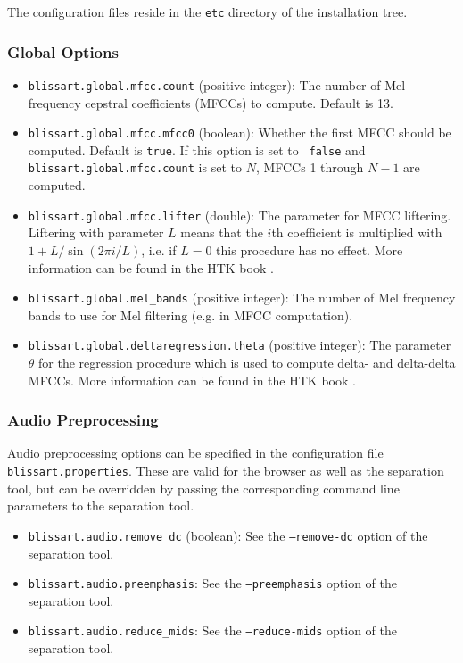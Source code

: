The configuration files reside in the {\tt etc} directory of the installation
tree.


\subsubsection{Global Options}
\label{section:ConfigFileGlobal}

\begin{itemize}
  \item   {\tt blissart.global.mfcc.count} (positive integer): The number of
    Mel frequency cepstral coefficients (MFCCs) to compute. Default is 13.
  \item   {\tt blissart.global.mfcc.mfcc0} (boolean): Whether the first MFCC
    should be computed. Default is {\tt true}. If this option is set to {\tt
    false} and {\tt blissart.global.mfcc.count} is set to $N$, MFCCs 1 through 
    $N-1$ are computed.
  \item   {\tt blissart.global.mfcc.lifter} (double): The parameter for MFCC
    liftering. Liftering with parameter $L$ means that the $i$th
    coefficient is multiplied with $1 + L / \sin(2\pi i / L)$, i.e. if
    $L=0$ this procedure has no effect. More information can be found in
    the HTK book \cite{HTKBook}.
  \item   {\tt blissart.global.mel\_bands} (positive integer): The number of
    Mel frequency bands to use for Mel filtering (e.g. in MFCC computation).
  \item   {\tt blissart.global.deltaregression.theta} (positive integer): The
    parameter $\theta$ for the regression procedure which is used to
    compute delta- and delta-delta MFCCs. More information can be found in
    the HTK book \cite{HTKBook}.
\end{itemize}


\subsubsection{Audio Preprocessing}
\label{section:ConfigFileAudio}

Audio preprocessing options can be specified in the configuration file {\tt
  blissart.properties}. These are valid for the browser as well as the
separation tool, but can be overridden by passing the corresponding command line
parameters to the separation tool.

\begin{itemize}
  \item {\tt blissart.audio.remove\_dc} (boolean): See the {\tt --remove-dc}
    option of the separation tool.
  \item {\tt blissart.audio.preemphasis}: See the {\tt --preemphasis} option of
    the separation tool.
  \item {\tt blissart.audio.reduce\_mids}: See the {\tt --reduce-mids} option of
    the separation tool.
\end{itemize}


